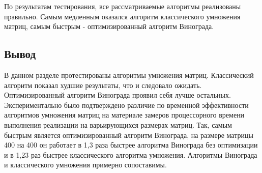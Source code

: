 По результатам тестирования, все рассматриваемые алгоритмы реализованы правильно. Самым медленным оказался алгоритм классического умножения матриц, самым быстрым - оптимизированный алгоритм Винограда.

\subsection{Вывод}
В данном разделе протестированы алгоритмы умножения матриц. Классический алгоритм показал худшие результаты, что и следовало ожидать. Оптимизированный алгоритм Винограда проявил себя лучше остальных. Экспериментально было подтверждено различие по временной эффективности алгоритмов умножения матриц на материале замеров процессорного времени выполнения реализации на варьирующихся размерах матриц. Так, самым быстрым является оптимизированный алгоритм Винограда, на размере матрицы 400 на 400 он работает в 1,3 раза быстрее алгоритма Винограда без оптимизации и в 1,23 раз быстрее классического алгоритма умножения. Алгоритмы Винограда и классического умножения примерно сопоставимы.
